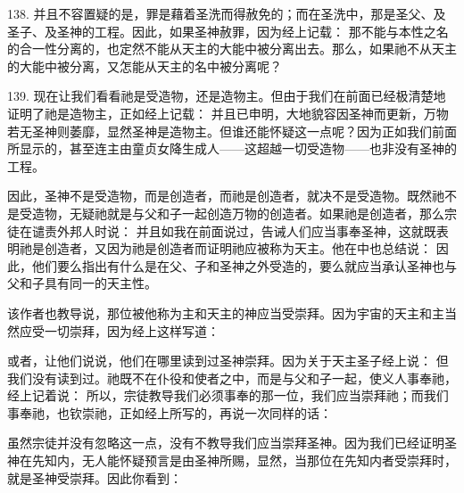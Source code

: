 138. 并且不容置疑的是，罪是藉着圣洗而得赦免的；而在圣洗中，那是圣父、及圣子、及圣神的工程。因此，如果圣神赦罪，因为经上记载：  那不能与本性之名的合一性分离的，也定然不能从天主的大能中被分离出去。那么，如果祂不从天主的大能中被分离，又怎能从天主的名中被分离呢？\par

139. 现在让我们看看祂是受造物，还是造物主。但由于我们在前面已经极清楚地证明了祂是造物主，正如经上记载：  并且已申明，大地貌容因圣神而更新，万物若无圣神则萎靡，显然圣神是造物主。但谁还能怀疑这一点呢？因为正如我们前面所显示的，甚至连主由童贞女降生成人——这超越一切受造物——也非没有圣神的工程。\par

因此，圣神不是受造物，而是创造者，而祂是创造者，就决不是受造物。既然祂不是受造物，无疑祂就是与父和子一起创造万物的创造者。如果祂是创造者，那么宗徒在谴责外邦人时说： 并且如我在前面说过，告诫人们应当事奉圣神，这就既表明祂是创造者，又因为祂是创造者而证明祂应被称为天主。他在中也总结说： 因此，他们要么指出有什么是在父、子和圣神之外受造的，要么就应当承认圣神也与父和子具有同一的天主性。\par

该作者也教导说，那位被他称为主和天主的神应当受崇拜。因为宇宙的天主和主当然应受一切崇拜，因为经上这样写道：\par

或者，让他们说说，他们在哪里读到过圣神崇拜。因为关于天主圣子经上说： 但我们没有读到过。祂既不在仆役和使者之中，而是与父和子一起，使义人事奉祂，经上记着说： 所以，宗徒教导我们必须事奉的那一位，我们应当崇拜祂；而我们事奉祂，也钦崇祂，正如经上所写的，再说一次同样的话：\par

虽然宗徒并没有忽略这一点，没有不教导我们应当崇拜圣神。因为我们已经证明圣神在先知内，无人能怀疑预言是由圣神所赐，显然，当那位在先知内者受崇拜时，就是圣神受崇拜。因此你看到：\par

